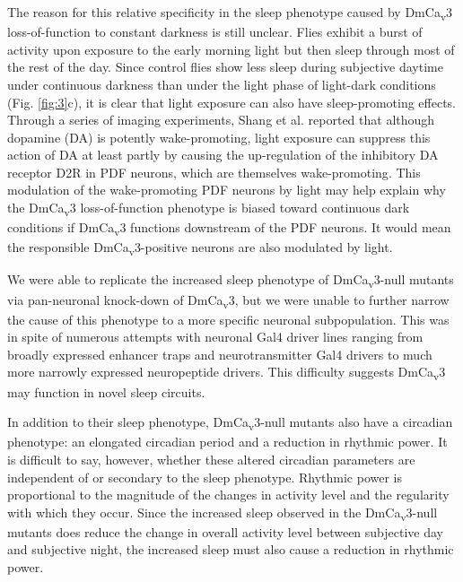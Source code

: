 The reason for this relative specificity in the sleep phenotype caused by DmCa\textsubscript{v}3 loss-of-function to constant darkness is still unclear.
Flies exhibit a burst of activity upon exposure to the early morning light but then sleep through most of the rest of the day.
Since control flies show less sleep during subjective daytime under continuous darkness than under the light phase of light-dark conditions (Fig. \ref{fig:3}c), it is clear that light exposure can also have sleep-promoting effects.
Through a series of imaging experiments, Shang et al. reported that although dopamine (DA) is potently wake-promoting, light exposure can suppress this action of DA at least partly by causing the up-regulation of the inhibitory DA receptor D2R in PDF neurons, which are themselves wake-promoting\cite{shang:2011aa}.
This modulation of the wake-promoting PDF neurons by light may help explain why the DmCa\textsubscript{v}3 loss-of-function phenotype is biased toward continuous dark conditions if DmCa\textsubscript{v}3 functions downstream of the PDF neurons. It would mean the responsible DmCa\textsubscript{v}3-positive neurons are also modulated by light.

We were able to replicate the increased sleep phenotype of DmCa\textsubscript{v}3-null mutants via pan-neuronal knock-down of DmCa\textsubscript{v}3, but we were unable to further narrow the cause of this phenotype to a more specific neuronal subpopulation.
This was in spite of numerous attempts with neuronal Gal4 driver lines ranging from broadly expressed enhancer traps and neurotransmitter Gal4 drivers to much more narrowly expressed neuropeptide drivers.
This difficulty suggests DmCa\textsubscript{v}3 may function in novel sleep circuits.

In addition to their sleep phenotype, DmCa\textsubscript{v}3-null mutants also have a circadian phenotype: an elongated circadian period and a reduction in rhythmic power.
It is difficult to say, however, whether these altered circadian parameters are independent of or secondary to the sleep phenotype.
Rhythmic power is proportional to the magnitude of the changes in activity level and the regularity with which they occur.
Since the increased sleep observed in the DmCa\textsubscript{v}3-null mutants does reduce the change in overall activity level between subjective day and subjective night, the increased sleep must also cause a reduction in rhythmic power.

